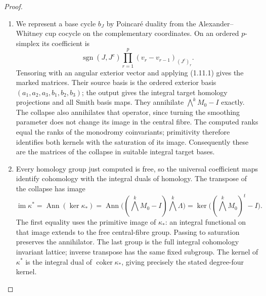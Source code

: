\begin{proof}
\begin{enumerate}[label={$\langle1\rangle$\arabic*.}]
\item We represent a base cycle $b_J$ by
Poincar\'e duality from the Alexander--Whitney cup cocycle on the
complementary coordinates.  On an ordered $p$-simplex its coefficient
is
\[
\operatorname{sgn}(J,J^c)
 \prod_{r=1}^p(v_r-v_{r-1})_{(J^c)_r}.
\]
Tensoring with an angular exterior vector and applying (1.11.1)
gives the marked matrices. Their source basis is the ordered exterior
basis $(a_1,a_2,a_3,b_1,b_2,b_3)$; the output gives the integral
target homology projections and all Smith basis maps.
They annihilate $\bigwedge^kM_0-I$ exactly.  The collapse also
annihilates that operator, since turning the smoothing parameter
does not change its image in the central fibre.  The computed ranks
equal the ranks of the monodromy coinvariants; primitivity therefore
identifies both kernels with the saturation of its image.
Consequently these are the matrices of the collapse in suitable integral target bases.

\item Every homology group just computed is free, so the universal
coefficient maps identify cohomology with the integral duals of homology.
The transpose of the collapse has image
\[
 \operatorname{im}\kappa^*
 =\operatorname{Ann}(\ker\kappa_*)
 =\operatorname{Ann}\bigl((\bigwedge^kM_0-I)\bigwedge^k\Lambda\bigr)
 =\ker\bigl((\bigwedge^kM_0)^t-I\bigr).
\]
The first equality uses the primitive image of $\kappa_*$: an integral
functional on that image extends to the free central-fibre group.
Passing to saturation preserves the annihilator. The last group is
the full integral cohomology invariant lattice; inverse transpose
has the same fixed subgroup. The kernel of $\kappa^*$ is the
integral dual of $\operatorname{coker}\kappa_*$, giving precisely the
stated degree-four kernel.
\end{enumerate}
\end{proof}

